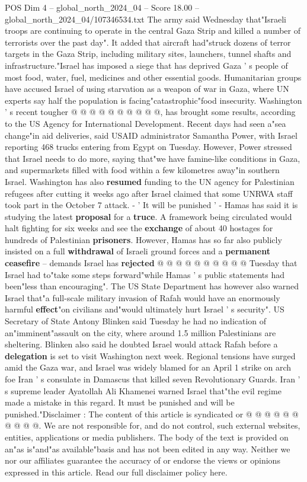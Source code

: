 \begin{textsample}{POS Dim 4 – global\_north\_2024\_04 – Score 18.00 – global\_north\_2024\_04/107346534.txt}
The army said Wednesday that"Israeli troops are continuing to operate in the central Gaza Strip and killed a number of terrorists over the past day".
It added that aircraft had"struck dozens of terror targets in the Gaza Strip, including military sites, launchers, tunnel shafts and infrastructure."Israel has imposed a siege that has deprived Gaza ' s people of most food, water, fuel, medicines and other essential goods.
Humanitarian groups have accused Israel of using starvation as a weapon of war in Gaza, where UN experts say half the population is facing"catastrophic"food insecurity.
Washington ' s recent tougher @ @ @ @ @ @ @ @ @ @, has brought some results, according to the US Agency for International Development.
Recent days had seen a"sea change"in aid deliveries, said USAID administrator Samantha Power, with Israel reporting 468 trucks entering from Egypt on Tuesday.
However, Power stressed that Israel needs to do more, saying that"we have famine-like conditions in Gaza, and supermarkets filled with food within a few kilometres away"in southern Israel.
Washington has also \textbf{resumed} funding to the UN agency for Palestinian refugees after cutting it weeks ago after Israel claimed that some UNRWA staff took part in the October 7 attack. - ' It will be punished ' - Hamas has said it is studying the latest \textbf{proposal} for a \textbf{truce}.
A framework being circulated would halt fighting for six weeks and see the \textbf{exchange} of about 40 hostages for hundreds of Palestinian \textbf{prisoners}.
However, Hamas has so far also publicly insisted on a full \textbf{withdrawal} of Israeli ground forces and a \textbf{permanent} \textbf{ceasefire} -- demands Israel has \textbf{rejected} @ @ @ @ @ @ @ @ @ @ Tuesday that Israel had to"take some steps forward"while Hamas ' s public statements had been"less than encouraging".
The US State Department has however also warned Israel that"a full-scale military invasion of Rafah would have an enormously harmful \textbf{effect}"on civilians and"would ultimately hurt Israel ' s security".
US Secretary of State Antony Blinken said Tuesday he had no indication of an"imminent"assault on the city, where around 1.5 million Palestinians are sheltering.
Blinken also said he doubted Israel would attack Rafah before a \textbf{delegation} is set to visit Washington next week.
Regional tensions have surged amid the Gaza war, and Israel was widely blamed for an April 1 strike on arch foe Iran ' s consulate in Damascus that killed seven Revolutionary Guards.
Iran ' s supreme leader Ayatollah Ali Khamenei warned Israel that"the evil regime made a mistake in this regard.
It must be punished and will be punished."Disclaimer : The content of this article is syndicated or @ @ @ @ @ @ @ @ @ @.
We are not responsible for, and do not control, such external websites, entities, applications or media publishers.
The body of the text is provided on an"as is"and"as available"basis and has not been edited in any way.
Neither we nor our affiliates guarantee the accuracy of or endorse the views or opinions expressed in this article.
Read our full disclaimer policy here.


\end{textsample}

